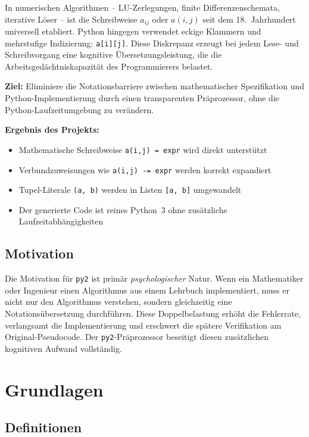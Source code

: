 ﻿\documentclass[a4paper,12pt]{article}
\theoremstyle{definition}
\begin{document}
In numerischen Algorithmen -- LU-Zerlegungen, finite Differenzenschemata, iterative
L\"oser -- ist die Schreibweise $a_{ij}$ oder $a(i,j)$ seit dem 18.\ Jahrhundert
universell etabliert. Python hingegen verwendet eckige Klammern und mehrstufige
Indizierung: \texttt{a[i][j]}. Diese Diskrepanz erzeugt bei jedem Lese- und
Schreibvorgang eine kognitive \"Ubersetzungsleistung, die die Arbeitsged\"achtniskapazit\"at
des Programmierers belastet.

\textbf{Ziel:} Eliminiere die Notationsbarriere zwischen mathematischer Spezifikation
und Python-Implementierung durch einen transparenten Pr\"aprozessor, ohne die
Python-Laufzeitumgebung zu ver\"andern.

\textbf{Ergebnis des Projekts:}
\begin{itemize}
	\item Mathematische Schreibweise \texttt{a(i,j) = expr} wird direkt unterst\"utzt
	\item Verbundzuweisungen wie \texttt{a(i,j) -= expr} werden korrekt expandiert
	\item Tupel-Literale \texttt{(a, b)} werden in Listen \texttt{[a, b]} umgewandelt
	\item Der generierte Code ist reines Python~3 ohne zus\"atzliche Laufzeitabh\"angigkeiten
\end{itemize}

\subsection{Motivation}

Die Motivation f\"ur \texttt{py2} ist prim\"ar \emph{psychologischer} Natur. Wenn ein
Mathematiker oder Ingenieur einen Algorithmus aus einem Lehrbuch implementiert, muss
er nicht nur den Algorithmus verstehen, sondern gleichzeitig eine Notations\"ubersetzung
durchf\"uhren. Diese Doppelbelastung erh\"oht die Fehlerrate, verlangsamt die Implementierung
und erschwert die spätere Verifikation am Original-Pseudocode. Der \texttt{py2}-Pr\"aprozessor
beseitigt diesen zus\"atzlichen kognitiven Aufwand vollst\"andig.

\section{Grundlagen}

\subsection{Definitionen}
\end{document}
